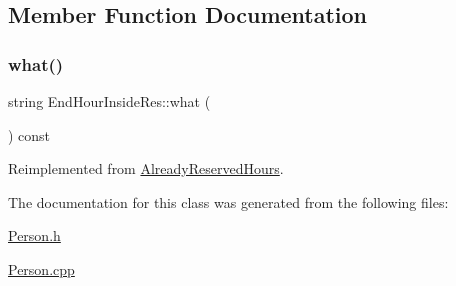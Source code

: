 \subsection{Member Function Documentation}
\mbox{\label{class_end_hour_inside_res_afee9514b15c167847bc55ebe833076ff}} 
\subsubsection{\texorpdfstring{what()}{what()}}
{\footnotesize\ttfamily string End\+Hour\+Inside\+Res\+::what (\begin{DoxyParamCaption}{ }\end{DoxyParamCaption}) const\hspace{0.3cm}{\ttfamily [virtual]}}



Reimplemented from \mbox{\hyperlink{class_already_reserved_hours_a69081ef7e75aa68b9aa5c75d02fe2194}{Already\+Reserved\+Hours}}.



The documentation for this class was generated from the following files\+:\begin{DoxyCompactItemize}
\item 
\mbox{\hyperlink{_person_8h}{Person.\+h}}\item 
\mbox{\hyperlink{_person_8cpp}{Person.\+cpp}}\end{DoxyCompactItemize}
